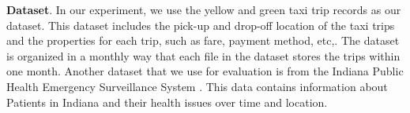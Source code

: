 {\bf Dataset}. 
In our experiment, we use the yellow and green taxi trip records as our dataset. 
This dataset includes the pick-up and drop-off location of the taxi trips and the properties for each trip, such as fare, payment method, etc,. The dataset is organized in a monthly way that each file in the dataset stores the trips within one month.
Another dataset that we use for evaluation is from the Indiana Public Health Emergency Surveillance System \cite{maciejewski2009generating}. This data contains information about Patients in Indiana and their health issues over time and location. 



